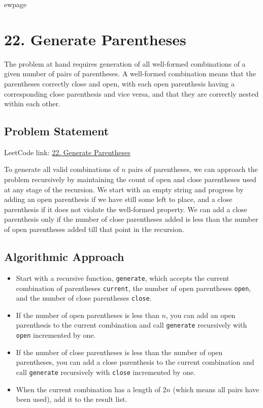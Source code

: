 
ewpage

\chapter{22. Generate Parentheses}
\label{chap:generate_parentheses}

The problem at hand requires generation of all well-formed combinations of a given number of pairs of parentheses. A well-formed combination means that the parentheses correctly close and open, with each open parenthesis having a corresponding close parenthesis and vice versa, and that they are correctly nested within each other.

\section*{Problem Statement}

LeetCode link: \href{https://leetcode.com/problems/generate-parentheses/}{22. Generate Parentheses}

To generate all valid combinations of $n$ pairs of parentheses, we can approach the problem recursively by maintaining the count of open and close parentheses used at any stage of the recursion. We start with an empty string and progress by adding an open parenthesis if we have still some left to place, and a close parenthesis if it does not violate the well-formed property. We can add a close parenthesis only if the number of close parentheses added is less than the number of open parentheses added till that point in the recursion.

\section*{Algorithmic Approach}

\begin{itemize}
    \item Start with a recursive function, \texttt{generate}, which accepts the current combination of parentheses \texttt{current}, the number of open parentheses \texttt{open}, and the number of close parentheses \texttt{close}.
    \item If the number of open parentheses is less than $n$, you can add an open parenthesis to the current combination and call \texttt{generate} recursively with \texttt{open} incremented by one.
    \item If the number of close parentheses is less than the number of open parentheses, you can add a close parenthesis to the current combination and call \texttt{generate} recursively with \texttt{close} incremented by one.
    \item When the current combination has a length of $2n$ (which means all pairs have been used), add it to the result list.
\end{itemize}

